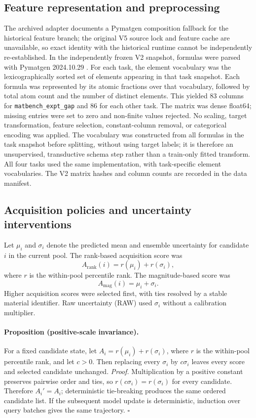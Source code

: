 \documentclass[11pt]{article}
\newcommand{\code}[1]{\texttt{#1}}
\begin{document}
\subsection{Feature representation and preprocessing}
The archived adapter documents a Pymatgen composition fallback for the historical feature branch; the original V5 source lock and feature cache are unavailable, so exact identity with the historical runtime cannot be independently re-established. In the independently frozen V2 snapshot, formulas were parsed with Pymatgen 2024.10.29 \citep{ong2013pymatgen}. For each task, the element vocabulary was the lexicographically sorted set of elements appearing in that task snapshot. Each formula was represented by its atomic fractions over that vocabulary, followed by total atom count and the number of distinct elements. This yielded 83 columns for \code{matbench\_expt\_gap} and 86 for each other task. The matrix was dense float64; missing entries were set to zero and non-finite values rejected. No scaling, target transformation, feature selection, constant-column removal, or categorical encoding was applied. The vocabulary was constructed from all formulas in the task snapshot before splitting, without using target labels; it is therefore an unsupervised, transductive schema step rather than a train-only fitted transform. All four tasks used the same implementation, with task-specific element vocabularies. The V2 matrix hashes and column counts are recorded in the data manifest.

\subsection{Acquisition policies and uncertainty interventions}
Let \(\mu_i\) and \(\sigma_i\) denote the predicted mean and ensemble uncertainty for candidate \(i\) in the current pool. The rank-based acquisition score was
\begin{equation}
 A_{\mathrm{rank}}(i)=r(\mu_i)+r(\sigma_i),
 \label{eq:rank}
\end{equation}
where \(r\) is the within-pool percentile rank. The magnitude-based score was
\begin{equation}
 A_{\mathrm{mag}}(i)=\mu_i+\sigma_i.
 \label{eq:mag}
\end{equation}
Higher acquisition scores were selected first, with ties resolved by a stable material identifier. Raw uncertainty (RAW) used \(\sigma_i\) without a calibration multiplier.

\paragraph{Proposition (positive-scale invariance).} For a fixed candidate state, let \(A_i=r(\mu_i)+r(\sigma_i)\), where \(r\) is the within-pool percentile rank, and let \(c>0\). Then replacing every \(\sigma_i\) by \(c\sigma_i\) leaves every score and selected candidate unchanged. \emph{Proof.} Multiplication by a positive constant preserves pairwise order and ties, so \(r(c\sigma_i)=r(\sigma_i)\) for every candidate. Therefore \(A_i'=A_i\); deterministic tie-breaking produces the same ordered candidate list. If the subsequent model update is deterministic, induction over query batches gives the same trajectory. \(\square\)
\end{document}
